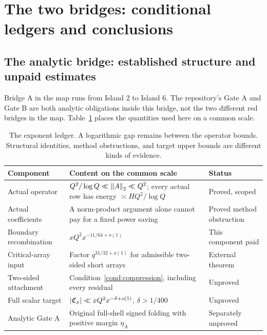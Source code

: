 \section{The two bridges: conditional ledgers and conclusions}\label{sec:bridges}
\subsection{The analytic bridge: established structure and unpaid estimates}
Bridge A in the map runs from Island 2 to Island 6. The repository's Gate A and Gate B are both analytic obligations inside this bridge, not the two different red bridges in the map.
Table~\ref{tab:ledger} places the quantities used here on a common scale.
\begin{table}[htbp]
\centering\small
\begin{tabularx}{\linewidth}{@{}>{\raggedright\arraybackslash}p{.19\linewidth}X>{\raggedright\arraybackslash}p{.19\linewidth}@{}}
\toprule
Component & Content on the common scale & Status\\\midrule
Actual operator & $Q^2/\log Q\ll\left\|A\right\|_2\ll Q^2$; every actual row has energy $\asymp HQ^2/\log Q$ & Proved, scoped\\
Actual coefficients & A norm-product argument alone cannot pay for a fixed power saving & Proved method obstruction\\
Boundary recombination & $xQ^2x^{-11/64+o(1)}$ & This component paid\\
Critical-array input & Factor $q^{31/32+o(1)}$ for admissible two-sided short arrays & External theorem\\
Two-sided attachment & Condition~\ref{cond:compression}, including every residual & Unproved\\
Full scalar target & $|\mathfrak C_x|\ll xQ^2x^{-\delta+o(1)}$, $\delta>1/400$ & Unproved\\
Analytic Gate A & Original full-shell signed folding with positive margin $\eta_A$ & Separately unproved\\
\bottomrule
\end{tabularx}
\caption{The exponent ledger. A logarithmic gap remains between the operator bounds. Structural identities, method obstructions, and target upper bounds are different kinds of evidence.}\label{tab:ledger}
\end{table}
